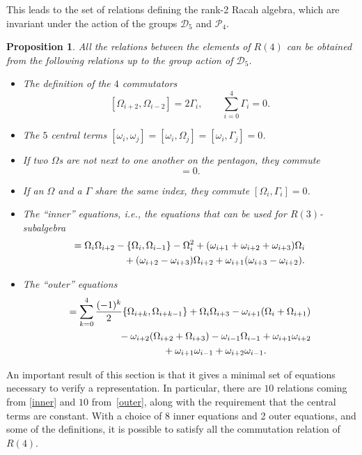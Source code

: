\documentclass[pdftex]{sigma}
\numberwithin{equation}{section}
\newtheorem{Proposition}[Theorem]{Proposition}
 { \theoremstyle{definition}
\newtheorem{Definition}[Theorem]{Definition}
\newtheorem{Note}[Theorem]{Note}
\newtheorem{Example}[Theorem]{Example}
\newtheorem{Remark}[Theorem]{Remark} }
\begin{document}
This leads to the set of relations defining the rank-2 Racah algebra, which are invariant under the action of the groups $\mathcal{D}_5$ and $\mathcal{P}_4$.
\begin{Proposition}
All the relations between the elements of $R(4)$ can be obtained from the following relations up to the group action of $\mathcal{D}_5$.
\begin{itemize}\itemsep=0pt
  \item The definition of the $4$ commutators
  \[
    [\Omega_{i+2},\Omega_{i-2}]=2\Gamma_i,\qquad
    \sum_{i=0}^4\Gamma_i=0.
  \]
  \item The $5$ central terms
$
    [\omega_i,\omega_j]=[\omega_i,\Omega_j]=[\omega_i,\Gamma_j]=0$.
  \item If two $\Omega$s are not next to one another on the pentagon, they commute
  \begin{equation}
    [\Omega_{i-1},\Omega_{i+1}]=0.\label{OmegaGamma0}
  \end{equation}
  \item If an $\Omega$ and a $\Gamma$ share the same index, they commute $[\Omega_i,\Gamma_i]=0$.
  \item The ``inner'' equations, i.e., the equations that can be used for $R(3)$-subalgebra
  \begin{gather}
    [\Omega_i,\Gamma_{i+2}]= \Omega_i\Omega_{i+2}-\lbrace \Omega_i,\Omega_{i-1}\rbrace-\Omega_i^2+(\omega_{i+1}+\omega_{i+2}+\omega_{i+3})\Omega_i\nonumber\\
\hphantom{[\Omega_i,\Gamma_{i+2}]=}{} +(\omega_{i+2}-\omega_{i+3})\Omega_{i+2}+\omega_{i+1}(\omega_{i+3}-\omega_{i+2}).\label{inner}
  \end{gather}
  \item The ``outer'' equations
  \begin{gather}
[\Omega_i,\Gamma_{i+1}]= \sum_{k=0}^4\frac{(-1)^k}{2}\lbrace \Omega_{i+k},\Omega_{i+k-1}\rbrace+\Omega_i\Omega_{i+3}-\omega_{i+1}(\Omega_i+\Omega_{i+1})\nonumber\\
\hphantom{[\Omega_i,\Gamma_{i+1}]=}{} -\omega_{i+2}(\Omega_{i+2}+\Omega_{i+3})-\omega_{i-1}\Omega_{i-1}+\omega_{i+1}\omega_{i+2}\nonumber\\
\hphantom{[\Omega_i,\Gamma_{i+1}]=}{} +\omega_{i+1}\omega_{i-1}+\omega_{i+2}\omega_{i-1}.\label{outer}
  \end{gather}
\end{itemize}
\end{Proposition}

An important result of this section is that it gives a minimal set of equations necessary to verify a representation. In particular, there are $10$ relations coming from \eqref{inner} and $10$ from~\eqref{outer}, along with the requirement that the central terms are constant. With a choice of 8 inner equations and 2 outer equations, and some of the definitions, it is possible to satisfy all the commutation relation of $R(4)$.
\end{document}
